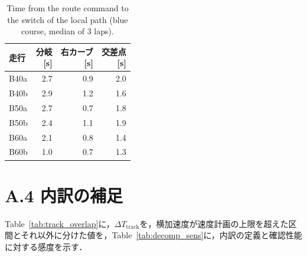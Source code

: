 \begin{table}[!htbp]
  \centering
  \caption{Time from the route command to the switch of the local path (blue course, median of 3 laps).}
  \label{tab:branch_switch}
  \small
  \begin{lrbox}{\tblbox}\begin{tabular}{lrrr}
    \toprule
    走行 & \shortstack[r]{分岐\\{[s]}} & \shortstack[r]{右カーブ\\{[s]}} & \shortstack[r]{交差点\\{[s]}} \\
    \midrule
    B40a & 2.7 & 0.9 & 2.0 \\
    B40b & 2.9 & 1.2 & 1.6 \\
    B50a & 2.7 & 0.7 & 1.8 \\
    B50b & 2.4 & 1.1 & 1.9 \\
    B60a & 2.1 & 0.8 & 1.4 \\
    B60b & 1.0 & 0.7 & 1.3 \\
    \bottomrule
  \end{tabular}\end{lrbox}\usebox{\tblbox}
\end{table}

\clearpage
\section*{A.4 内訳の補足}
\label{sec:app_decomp_extra}
Table~\ref{tab:track_overlap}に，$\Delta T_{\mathrm{track}}$を，横加速度が速度計画の上限を超えた区間とそれ以外に分けた値を，Table~\ref{tab:decomp_sens}に，内訳の定義と確認性能に対する感度を示す．

